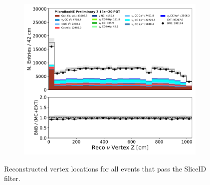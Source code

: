 \begin{figure}[H]
\begin{subfigure}[b]{0.3\textwidth}
        \end{subfigure}
        \begin{subfigure}[b]{0.3\textwidth}
        \centering
        \includegraphics[width=\textwidth]{NuMuCCsel/Images/Ryan/appendix_presel_input_R3/reco_nu_vtx_sce_z_07262020_samples_event_category.pdf}
        \end{subfigure}
    \caption{Reconstructed vertex locations for all events that pass the SliceID filter.}
    \label{fig::Appendix::constraint:inputvars:reconuvtx}
\end{figure}

